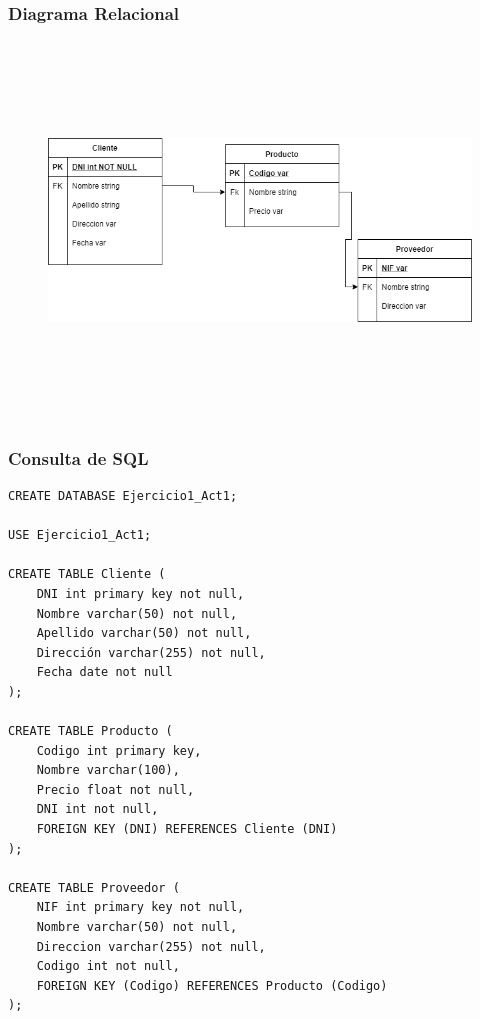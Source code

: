\documentclass[a4paper, 12pt]{article}
\begin{document}
\begin{justify}
        \subsubsection{Diagrama Relacional}
        \begin{figure}[H]
            \centering
            \includegraphics[width=16cm,height=10cm]{rel1.png}
        \end{figure}
        \subsubsection{Consulta de SQL}
\begin{verbatim}
CREATE DATABASE Ejercicio1_Act1;

USE Ejercicio1_Act1;

CREATE TABLE Cliente (
    DNI int primary key not null,
    Nombre varchar(50) not null,
    Apellido varchar(50) not null,
    Dirección varchar(255) not null,
    Fecha date not null
);

CREATE TABLE Producto (
    Codigo int primary key,
    Nombre varchar(100),
    Precio float not null,
    DNI int not null,
    FOREIGN KEY (DNI) REFERENCES Cliente (DNI)
);

CREATE TABLE Proveedor (
	NIF int primary key not null,
	Nombre varchar(50) not null,
	Direccion varchar(255) not null,
	Codigo int not null,
	FOREIGN KEY (Codigo) REFERENCES Producto (Codigo)
);
\end{verbatim}

\end{justify}
\end{document}
